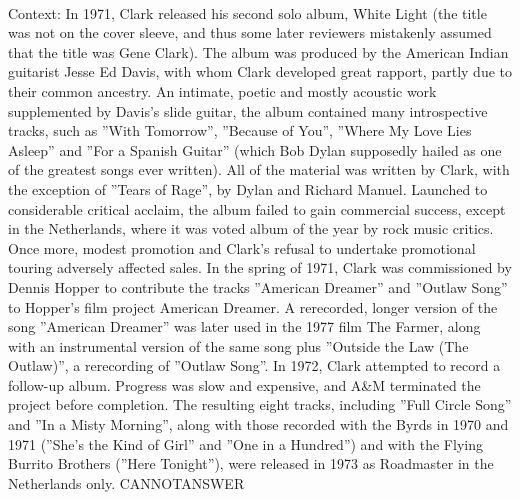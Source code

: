 \documentclass[11pt,a4paper, onecolumn]{article}
\begin{document}
\\ Context: In 1971, Clark released his second solo album, White Light (the title was not on the cover sleeve, and thus some later reviewers mistakenly assumed that the title was Gene Clark). The album was produced by the American Indian guitarist Jesse Ed Davis, with whom Clark developed great rapport, partly due to their common ancestry. An intimate, poetic and mostly acoustic work supplemented by Davis's slide guitar, the album contained many introspective tracks, such as ''With Tomorrow'', ''Because of You'', ''Where My Love Lies Asleep'' and ''For a Spanish Guitar'' (which Bob Dylan supposedly hailed as one of the greatest songs ever written). All of the material was written by Clark, with the exception of ''Tears of Rage'', by Dylan and Richard Manuel. Launched to considerable critical acclaim, the album failed to gain commercial success, except in the Netherlands, where it was voted album of the year by rock music critics. Once more, modest promotion and Clark's refusal to undertake promotional touring adversely affected sales. In the spring of 1971, Clark was commissioned by Dennis Hopper to contribute the tracks ''American Dreamer'' and ''Outlaw Song'' to Hopper's film project American Dreamer. A rerecorded, longer version of the song ''American Dreamer'' was later used in the 1977 film The Farmer, along with an instrumental version of the same song plus ''Outside the Law (The Outlaw)'', a rerecording of ''Outlaw Song''. In 1972, Clark attempted to record a follow-up album. Progress was slow and expensive, and A&M terminated the project before completion. The resulting eight tracks, including ''Full Circle Song'' and ''In a Misty Morning'', along with those recorded with the Byrds in 1970 and 1971 (''She's the Kind of Girl'' and ''One in a Hundred'') and with the Flying Burrito Brothers (''Here Tonight''), were released in 1973 as Roadmaster in the Netherlands only. CANNOTANSWER
\end{document}
